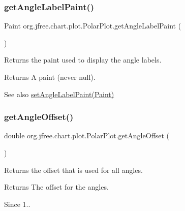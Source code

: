 \subsubsection{\texorpdfstring{get\+Angle\+Label\+Paint()}{getAngleLabelPaint()}}
{\footnotesize\ttfamily Paint org.\+jfree.\+chart.\+plot.\+Polar\+Plot.\+get\+Angle\+Label\+Paint (\begin{DoxyParamCaption}{ }\end{DoxyParamCaption})}

Returns the paint used to display the angle labels.

\begin{DoxyReturn}{Returns}
A paint (never {\ttfamily null}).
\end{DoxyReturn}
\begin{DoxySeeAlso}{See also}
\mbox{\hyperlink{classorg_1_1jfree_1_1chart_1_1plot_1_1_polar_plot_a99d459dade42417f00c7cd05f506b9a5}{set\+Angle\+Label\+Paint(\+Paint)}} 
\end{DoxySeeAlso}
\mbox{\label{classorg_1_1jfree_1_1chart_1_1plot_1_1_polar_plot_abb7d874d8406ec1fe25a27d5ead0cd34}} 
\subsubsection{\texorpdfstring{get\+Angle\+Offset()}{getAngleOffset()}}
{\footnotesize\ttfamily double org.\+jfree.\+chart.\+plot.\+Polar\+Plot.\+get\+Angle\+Offset (\begin{DoxyParamCaption}{ }\end{DoxyParamCaption})}

Returns the offset that is used for all angles.

\begin{DoxyReturn}{Returns}
The offset for the angles. 
\end{DoxyReturn}
\begin{DoxySince}{Since}
1.. 
\end{DoxySince}
\mbox{\label{classorg_1_1jfree_1_1chart_1_1plot_1_1_polar_plot_ac1d209b7e5ba1bb53c529f7bdb59b501}} 
